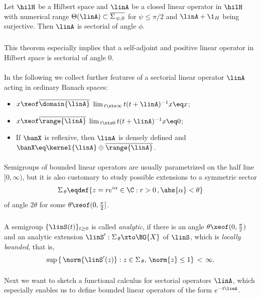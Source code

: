 \documentclass[11pt,twoside]{article}
\begin{document}
\begin{theorem1}
Let $\hilH$ be a Hilbert space and $\linA$ be a closed linear operator
in $\hilH$ with numerical range
$\Theta(\linA) \subset \overline{\Sigma_{\,\psi,0}}$ for $\psi \leq \pi/2$
and $\linA + \1_H$ being surjective.
Then $\linA$ is sectorial of angle $\phi$.
\end{theorem1}

\subparagraph{}
This theorem especially implies that a self-adjoint and positive
linear operator in Hilbert space is sectorial of angle $0$.

\paragraph{} %
In the following we collect further features
of a sectorial linear operator $\linA$ acting in ordinary Banach spaces:

\begin{itemize}
\item[1.]
$x \xeof \overline{\domain{\linA}}$ \iff
$\lim_{\,t \xto \infty} t(t+\linA)^{-1}x \eq x$;
\item[2.]
$x \xeof \overline{\range{\linA}}$ \iff
$\lim_{\,t \xto 0} t(t+\linA)^{-1}x \eq 0$;
\item[3.]
If $\banX$ is reflexive, then $\linA$ is densely defined and
$\banX \eq \kernel{\linA} \oplus \overline{\range{\linA}}$.
\end{itemize}

\paragraph{} %
Semigroups of bounded linear operators are usually parametrized
on the half line $[0,\infty)$,
but it is also customary to study possible extensions to a symmetric sector
\[
\Sigma_{\,\theta} \eqdef
\{z=re^{i\alpha} \in \C: r > 0\,, \abs{\alpha} < \theta\}
\]
of angle $2 \theta$ for some $\theta \xeof (0,\frac{\pi}{2}]$.

\subparagraph{} %
A semigroup $\{\linS(t)\}_{t \geq 0}$ is called \textit{analytic},
if there is an angle $\theta \xeof (0,\frac{\pi}{2})$
and an analytic extension $\linS':\Sigma_{\,\theta} \xto \BO{X}$ of $\linS$,
which is \textit{locally bounded},
that is,
\[
\sup \,
\{ \, \norm{\linS'(z)}: z \in \Sigma_{\,\theta}, \, \norm{z} \leq 1 \}
\, < \, \infty.
\]

\paragraph{} %
Next we want to sketch a functional calculus for sectorial operators $\linA$,
which especially enables us to define bounded linear operators
of the form $e^{-t \linA}$.
\end{document}

